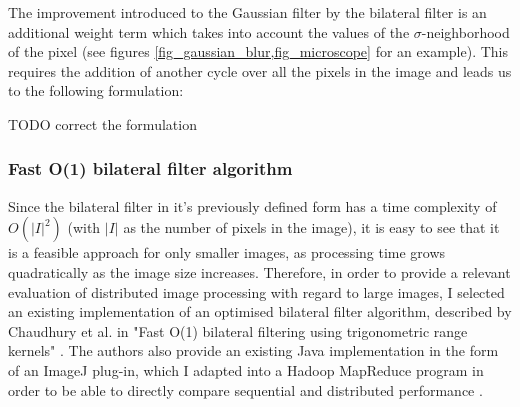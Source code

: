 \documentclass [12pt,a4paper]{report}
\begin{document}
The improvement introduced to the Gaussian filter by the bilateral filter is an additional weight term which takes into account the values of the $\sigma$-neighborhood of the pixel (see figures \ref{fig_gaussian_blur,fig_microscope} for an example). This requires the addition of another cycle over all the pixels in the image and leads us to the following formulation:

\begin{center}
\begin{algorithm}[H]
\end{algorithm}
\end{center}

TODO correct the formulation

\subsubsection{Fast O(1) bilateral filter algorithm}

Since the bilateral filter in it's previously defined form has a time complexity of $O(|I|^2)$ (with $|I|$ as the number of pixels in the image), it is easy to see that it is a feasible approach for only smaller images, as processing time grows quadratically as the image size increases. Therefore, in order to provide a relevant evaluation of distributed image processing with regard to large images, I selected an existing implementation of an optimised bilateral filter algorithm, described by Chaudhury et al. in "Fast O(1) bilateral filtering using trigonometric range kernels" \cite{chaudhury2011fast}. The authors also provide an existing Java implementation in the form of an ImageJ plug-in, which I adapted into a Hadoop MapReduce program in order to be able to directly compare sequential and distributed performance \cite{imagej}.
\end{document}
